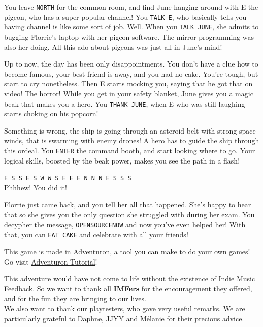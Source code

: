 \documentclass{article}
\newcommand{\bbro}[1] {\textbf{\textcolor{darksienna}{#1}}}
\newcommand{\bckg}[1]{\AddToShipoutPictureBG*{\texttt{[image: \#1]}}}
\begin{document}
You leave \texttt{NORTH} for the common room,
and find June hanging around with E the pigeon, who has a super-popular channel!
You \texttt{TALK E}, who basically tells you having channel is like some sort of job.
Well. When you \texttt{TALK JUNE}, she admits to bugging Florrie's laptop with her pigeon software.
The mirror programming was also her doing.
All this ado about pigeons was just all in June's mind!

Up to now, the day has been only disappointments.
You don't have a clue how to become famous, your best friend is away, and you had no cake.
You're tough, but start to cry nonetheless.
Then E starts mocking you, saying that he got that on video! The horror!
While you get in your safety blanket, June gives you a magic beak that makes you a hero.
You \texttt{THANK JUNE}, when E who was still laughing starts choking on his popcorn!

Something is wrong, the ship is going through an asteroid belt with strong space winds,
that is swarming with enemy drones! A hero has to guide the ship through this ordeal.
You \texttt{ENTER} the command booth, and start looking where to go.
Your logical skills, boosted by the beak power, makes you see the path in a flash!

\texttt{E S S E S W W S E E E N N N E S S S} \\
Phhhew! You did it!

Florrie just came back, and you tell her all that happened.
She's happy to hear that so she gives you the only question she struggled with during her exam.
You decypher the message, \texttt{OPENSOURCENOW} and now you've even helped her!
With that, you can \texttt{EAT CAKE} and celebrate with all your friends!

\clearpage

\bckg{img/bg}

This game is made in Adventuron, a tool you can make to do your own games!
Go visit \href{https://adventuron.io/documentation/tutorial-a.html}{Adventuron Tutorial}!

This adventure would have not come to life without the existence of \href{https://indiemusicfeedback.com}{Indie Music Feedback}.
So we want to thank all \bbro{IMFers} for the encouragement they offered, and for the fun they are bringing to our lives.\\

We also want to thank our playtesters, who gave very useful remarks.
We are particularly grateful to \href{https://daphnecerez.carrd.co/}{Daphne},
JJYY and Mélanie for their precious advice.\\
\end{document}
